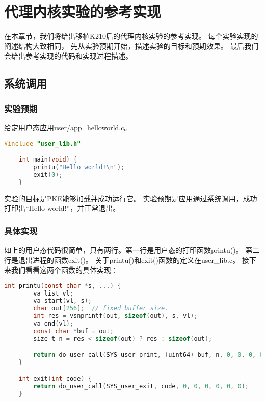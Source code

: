 \chapter{代理内核实验的参考实现}

在本章节，我们将给出移植K210后的代理内核实验的参考实现。
每个实验实现的阐述结构大致相同，
先从实验预期开始，描述实验的目标和预期效果。
最后我们会给出参考实现的代码和实现过程描述。

\section{系统调用}

\subsection{实验预期}

给定用户态应用user/app\_helloworld.c。

\begin{lstlisting}[caption={用户态应用app\_helloworld.c}, label={lst:app_helloworld}, language=C]
    #include "user_lib.h"

    int main(void) {
        printu("Hello world!\n");
        exit(0);
    }   
\end{lstlisting}

实验的目标是PKE能够加载并成功运行它。
实验预期是应用通过系统调用，成功打印出“Hello world!”，并正常退出。

\subsection{具体实现}

如上的用户态代码很简单，只有两行。第一行是用户态的打印函数printu()。
第二行是退出进程的函数exit()。
关于printu()和exit()函数的定义在user\_lib.c。
接下来我们看看这两个函数的具体实现：

\begin{lstlisting}[caption={printu与exit的实现}, label={lst:printu_exit}, language=C]
    int printu(const char *s, ...) {
        va_list vl;
        va_start(vl, s);
        char out[256];  // fixed buffer size.
        int res = vsnprintf(out, sizeof(out), s, vl);
        va_end(vl);
        const char *buf = out;
        size_t n = res < sizeof(out) ? res : sizeof(out);

        return do_user_call(SYS_user_print, (uint64) buf, n, 0, 0, 0, 0, 0);
    }

    int exit(int code) {
        return do_user_call(SYS_user_exit, code, 0, 0, 0, 0, 0, 0);
    }   
\end{lstlisting}

